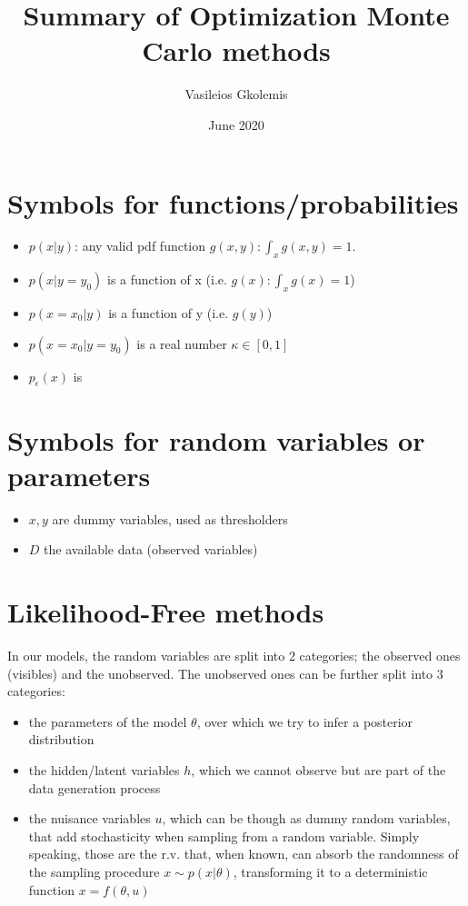 \documentclass{article}
\title{Summary of Optimization Monte Carlo methods}
\author{Vasileios Gkolemis}
\date{June 2020}
\begin{document}
\maketitle

\section{Symbols for functions/probabilities}

\begin{itemize}
    \item $p(x|y)$: any valid pdf function $g(x,y): \int_x g(x,y) = 1$. 
    \item $p(x|y=y_0)$ is a function of x (i.e. $g(x): \int_x g(x) = 1$)  
    \item $p(x=x_0|y)$ is a function of y (i.e. $g(y)$) 
    \item $p(x=x_0|y=y_0)$ is a real number $\kappa \in [0,1]$
    \item $p_\epsilon(x)$ is 
\end{itemize}

\section{Symbols for random variables or parameters}

\begin{itemize}
    \item $x, y$ are dummy variables, used as thresholders
    \item $D$ the available data (observed variables)
\end{itemize}




\section{Likelihood-Free methods}

In our models, the random variables are split into 2 categories; the observed ones (visibles) and the unobserved. The unobserved ones can be further split into 3 categories:

\begin{itemize}
    \item the parameters of the model $\theta$, over which we try to infer a posterior distribution
    \item the hidden/latent variables $h$, which we cannot observe but are part of the data generation process
    \item the nuisance variables $u$, which can be though as dummy random variables, that add stochasticity when sampling from a random variable. Simply speaking, those are the r.v. that, when known, can absorb the randomness of the sampling procedure $x \sim p(x|\theta)$, transforming it to a deterministic function $x = f(\theta, u)$
\end{itemize}
\end{document}
